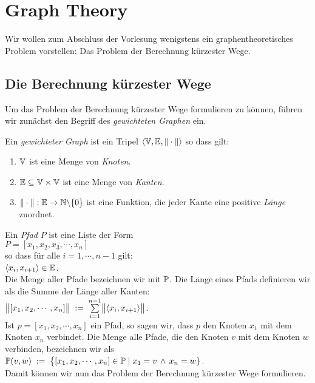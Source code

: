 \chapter{Graph Theory}
Wir wollen zum Abschluss der Vorlesung wenigstens ein graphentheoretisches Problem
vorstellen: Das Problem der Berechnung  k\"urzester Wege. 


\section[Shortest Paths]{Die Berechnung k\"urzester Wege}
Um das Problem der Berechnung k\"urzester Wege formulieren zu k\"onnen, f\"uhren wir zun\"achst 
den Begriff des \emph{gewichteten Graphen} ein.  

\begin{Definition} \lb
  Ein  {\em gewichteter Graph} ist ein Tripel 
   $\langle {\mathbb V}, {\mathbb E}, \|\cdot\| \rangle$ so dass gilt:
  \begin{enumerate}
  \item ${\mathbb V}$ ist eine Menge von \emph{Knoten}.
  \item ${\mathbb E} \subseteq {\mathbb V} \times {\mathbb V}$ ist eine Menge von \emph{Kanten}.
  \item $\|\cdot\|: {\mathbb E} \rightarrow {\mathbb N} \backslash\{0\}$ ist eine Funktion,
        die jeder Kante eine positive \emph{L\"ange} zuordnet.
        \conclude
  \end{enumerate}
\end{Definition}

\noindent
Ein \emph{Pfad} $P$ ist eine Liste der Form \\[0.2cm]
\hspace*{1.3cm} $P = [ x_1, x_2, x_3, \cdots, x_n ]$ \\[0.2cm]
so dass f\"ur alle $i = 1, \cdots, n-1$ gilt: \\[0.2cm]
\hspace*{1.3cm} $\pair(x_i,x_{i+1}) \in \edges$. \\[0.2cm]
Die Menge aller Pfade bezeichnen wir mit ${\mathbb P}$.
Die L\"ange eines Pfads definieren wir als die Summe der L\"ange aller Kanten:
\\[0.2cm]
\hspace*{1.3cm} $\Weight{[x_1,x_2, \cdots, x_n]} \df \sum\limits_{i=1}^{n-1} \Weight{\pair(x_i,x_{i+1})}$. \\[0.2cm]
Ist $p = [x_1, x_2, \cdots, x_n]$ ein Pfad, so sagen wir, dass $p$ den Knoten $x_1$ mit dem
Knoten $x_n$ verbindet.   Die Menge alle Pfade, die den Knoten $v$ mit dem Knoten $w$
verbinden, bezeichnen wir als \\[0.2cm]
\hspace*{1.3cm} 
 ${\mathbb P}(v,w) \;:=\; \bigl\{ [x_1, x_2, \cdots, x_n] \in {\mathbb P} \mid x_1 = v \,\wedge\, x_n = w \}$.
\\[0.2cm]
Damit k\"onnen wir nun das Problem der Berechnung k\"urzester Wege formulieren.
\pagebreak


